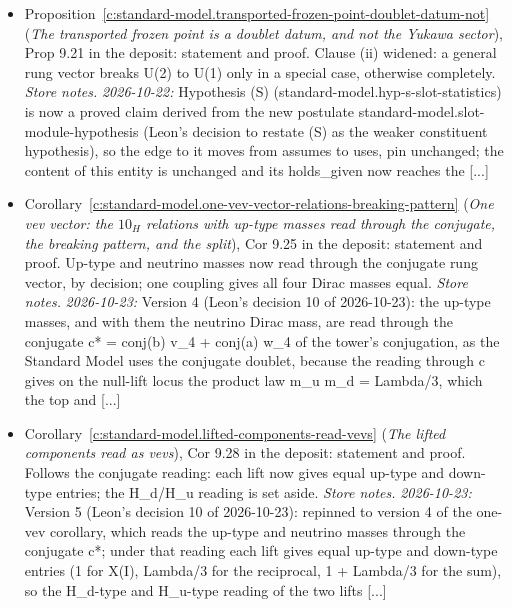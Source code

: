 \documentclass[11pt]{article}
\theoremstyle{definition}
\theoremstyle{plain}
\begin{document}
\begin{itemize}
\item Proposition~\ref{c:standard-model.transported-frozen-point-doublet-datum-not} (\emph{The transported frozen point is a doublet datum, and not the Yukawa sector}), Prop 9.21 in the deposit: statement and proof. Clause (ii) widened: a general rung vector breaks U(2) to U(1) only in a special case, otherwise completely. \emph{Store notes.} \emph{2026-10-22:} Hypothesis (S) (standard-model.hyp-s-slot-statistics) is now a proved claim derived from the new postulate standard-model.slot-module-hypothesis (Leon's decision to restate (S) as the weaker constituent hypothesis), so the edge to it moves from assumes to uses, pin unchanged; the content of this entity is unchanged and its holds\_given now reaches the [...]
\item Corollary~\ref{c:standard-model.one-vev-vector-relations-breaking-pattern} (\emph{One vev vector: the $10_{H}$ relations with up-type masses read through the conjugate, the breaking pattern, and the split}), Cor 9.25 in the deposit: statement and proof. Up-type and neutrino masses now read through the conjugate rung vector, by decision; one coupling gives all four Dirac masses equal. \emph{Store notes.} \emph{2026-10-23:} Version 4 (Leon's decision 10 of 2026-10-23): the up-type masses, and with them the neutrino Dirac mass, are read through the conjugate c* = conj(b) v\_4 + conj(a) w\_4 of the tower's conjugation, as the Standard Model uses the conjugate doublet, because the reading through c gives on the null-lift locus the product law m\_u m\_d = Lambda/3, which the top and [...]
\item Corollary~\ref{c:standard-model.lifted-components-read-vevs} (\emph{The lifted components read as vevs}), Cor 9.28 in the deposit: statement and proof. Follows the conjugate reading: each lift now gives equal up-type and down-type entries; the H\_d/H\_u reading is set aside. \emph{Store notes.} \emph{2026-10-23:} Version 5 (Leon's decision 10 of 2026-10-23): repinned to version 4 of the one-vev corollary, which reads the up-type and neutrino masses through the conjugate c*; under that reading each lift gives equal up-type and down-type entries (1 for X(I), Lambda/3 for the reciprocal, 1 + Lambda/3 for the sum), so the H\_d-type and H\_u-type reading of the two lifts [...]

\end{itemize}
\end{document}
